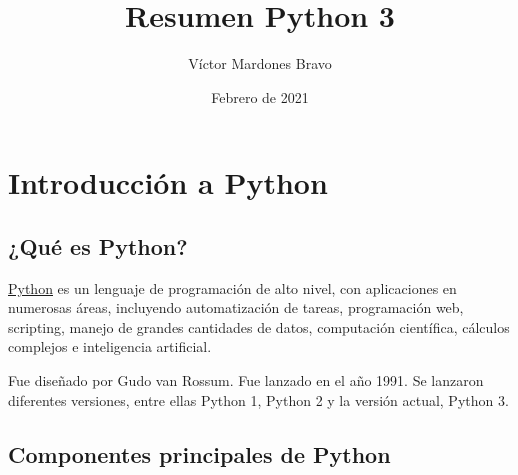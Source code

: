\documentclass{report}
\title{Resumen Python 3}
\author{Víctor Mardones Bravo}
\date{Febrero de 2021}
\begin{document}

\null
\nointerlineskip
\vfill
\let\snewpage \newpage
\let\newpage \relax
  {\centering\def\svgwidth{\columnwidth}
  }
\maketitle
\let \newpage \snewpage
\vfill 
\break

\clearpage

\tableofcontents

\clearpage


\chapter{Introducción a Python}

\section{¿Qué es Python?}

\href{https://www.python.org}{\underline{Python}} es un lenguaje de programación de alto nivel, con aplicaciones en numerosas áreas, incluyendo automatización de tareas, programación web, scripting, manejo de grandes cantidades de datos, computación científica, cálculos complejos e inteligencia artificial.

Fue diseñado por Gudo van Rossum. Fue lanzado en el año 1991. Se lanzaron diferentes versiones, entre ellas Python 1, Python 2 y la versión actual, Python 3.

\section{Componentes principales de Python}
\end{document}
